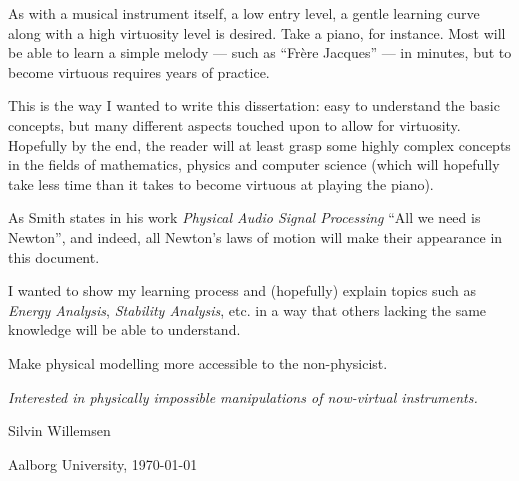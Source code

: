 As with a musical instrument itself, a low entry level, a gentle learning curve along with a high virtuosity level is desired. Take a piano, for instance. Most will be able to learn a simple melody — such as “Fr\`ere Jacques” — in minutes, but to become virtuous requires years of practice.

This is the way I wanted to write this dissertation: easy to understand the basic concepts, but many different aspects touched upon to allow for virtuosity. Hopefully by the end, the reader will at least grasp some highly complex concepts in the fields of mathematics, physics and computer science (which will hopefully take less time than it takes to become virtuous at playing the piano). 

As Smith states in his work \textit{Physical Audio Signal Processing} \cite{Smith2010} ``All we need is Newton'', and indeed, all Newton's laws of motion will make their appearance in this document.


I wanted to show my learning process and (hopefully) explain topics such as \textit{Energy Analysis}, \textit{Stability Analysis}, etc. in a way that others lacking the same knowledge %
will be able to understand.

Make physical modelling more accessible to the non-physicist.

\textit{Interested in physically impossible manipulations of now-virtual instruments.}

\vfill
\hfill Silvin Willemsen

\hfill Aalborg University, \today
